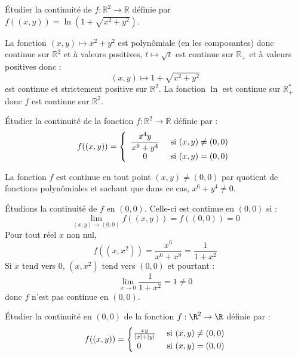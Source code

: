 \documentclass[a4paper,10pt]{report}
\begin{document}
\begin{Exercice}{} Étudier la continuité de $f : \mathbb{R}^2 \rightarrow \mathbb{R}$ définie par $f((x,y))= \ln(1 + \sqrt{x^2+y^2})$.
\end{Exercice}

\corr La fonction $(x,y) \mapsto x^2+y^2$ est polynômiale (en les composantes) donc continue sur $\mathbb{R}^2$ et à valeurs positives, $t \mapsto \sqrt{t}$ est continue sur $\mathbb{R}_+$ et à valeurs positives donc :
$$ (x,y) \mapsto 1+ \sqrt{x^2+y^2}$$
est continue et strictement positive sur $\mathbb{R}^2$. La fonction $\ln$ est continue sur $\mathbb{R}_+^{*}$ donc $f$ est continue sur $\mathbb{R}^2$.

\begin{Exercice}{} Étudier la continuité de la fonction $f : \mathbb{R}^2 \rightarrow \mathbb{R}$ définie par :
$$ f((x,y)) = \left\lbrace \begin{array}{cl}
\dfrac{x^4 y}{x^6+y^4} & \hbox{ si } (x,y) \neq (0,0) \\
0 & \hbox{ si } (x,y)=(0,0) \\
\end{array}\right.$$
\end{Exercice}

\corr La fonction $f$ est continue en tout point $(x,y) \neq (0,0)$ par quotient de fonctions polynômiales et sachant que dans ce cas, $x^6+y^4 \neq 0$. 

\medskip

\noindent Étudions la continuité de $f$ en $(0,0)$. Celle-ci est continue en $(0,0)$ si :
$$ \lim_{(x,y) \rightarrow (0,0)} f((x,y)) =f((0,0))= 0$$
Pour tout réel $x$ non nul,
$$ f((x,x^2)) = \dfrac{x^6}{x^6+x^8} = \dfrac{1}{1+x^2}$$
Si $x$ tend vers $0$, $(x,x^2)$ tend vers $(0,0)$ et pourtant :
$$ \lim_{x \rightarrow 0} \dfrac{1}{1+x^2} = 1 \neq 0$$
donc $f$ n'est pas continue en $(0,0)$.

\begin{Exercice}{} Étudier la continuité en $(0,0)$ de la fonction $f : \R^{2} \rightarrow \R$ définie par :
  \[
  f((x,y)) =
  \begin{cases}
    \frac{xy}{\vert x \vert + \vert y \vert} & \hbox{ si } (x,y) \neq (0,0) \\
    \, \; 0 & \hbox{ si } (x,y)=(0,0)
  \end{cases}
  \]
\end{Exercice}
\end{document}
